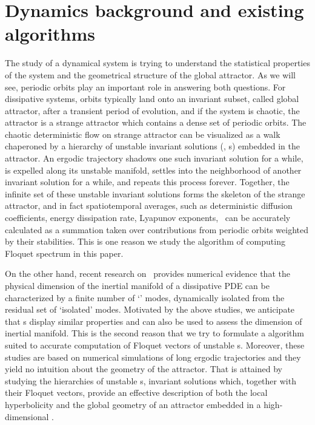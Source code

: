 \documentclass[final,leqno,onefignum,onetabnum]{siamltexmm}
\begin{document}
\section{Dynamics background and existing algorithms}
\label{sect:dynamics}

The study of a dynamical system is trying to understand
the statistical properties of the system and the geometrical structure
of the global attractor. As we will see, periodic orbits play an important
role in answering both questions. For dissipative systems,
orbits typically land onto an invariant subset, called global attractor,
after a transient period {of evolution}, and if the system is chaotic, the attractor is
a strange attractor which contains a dense set of
periodic orbits. The chaotic deterministic flow on strange attractor can be
visualized as a walk chaperoned by a hierarchy of unstable invariant
solutions (\eqva, \po s) embedded in the attractor. An
ergodic trajectory shadows one such invariant solution for a while, is
expelled along its unstable manifold, settles into the neighborhood of
another invariant solution for a while, and {repeats this process forever}.
Together, the infinite set of these unstable invariant solutions forms
the skeleton of {the strange attractor}, and in fact spatiotemporal averages,
such as deterministic diffusion coefficients, energy dissipation rate,
Lyapunov exponents, \etc\ can be
accurately calculated as {a summation taken over contributions from
periodic orbits weighted by their stabilities}.
This is one reason we study
the algorithm of computing Floquet spectrum in this paper.

On the other hand, {recent research on \cLvs\ provides numerical
evidence that the
physical dimension of
the inertial manifold of a dissipative PDE can be
characterized by a {finite number} of `{\entangled}' modes, dynamically
isolated from the residual set of `{isolated}' modes.
Motivated by the above studies, we anticipate that \Fv s display similar
properties and can also
be used to assess the dimension of inertial manifold.
This is the second reason that we try to formulate
a {\ped} algorithm suited to accurate computation of Floquet vectors
of unstable \po s. Moreover,
these studies are based
on numerical simulations of long ergodic trajectories} and they yield no
intuition about the geometry of the attractor. That is attained by
studying the hierarchies of unstable \po s, invariant solutions which,
together with their Floquet vectors, provide an effective description  of
both the local hyperbolicity and the global geometry of an attractor
embedded in a high-dimensional \statesp.
\end{document}
